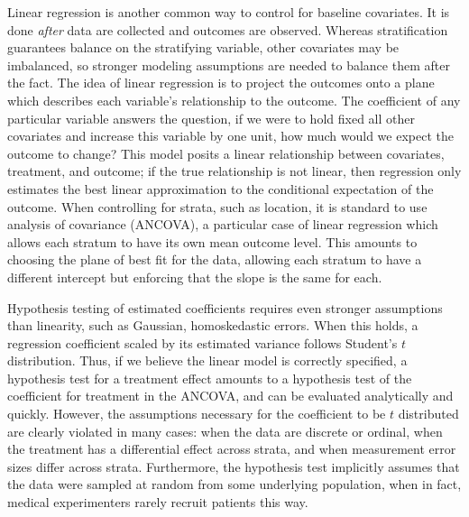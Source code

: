 \documentclass[11pt]{article}
\begin{document}
Linear regression is another common way to control for baseline covariates.
It is done \textit{after} data are collected and outcomes are observed.
Whereas stratification guarantees balance on the stratifying variable, other covariates may be imbalanced, so stronger modeling assumptions are needed to balance them after the fact.
The idea of linear regression is to project the outcomes onto a plane which describes each variable's relationship to the outcome.
The coefficient of any particular variable answers the question, if we were to hold fixed all other covariates and increase this variable by one unit, how much would we expect the outcome to change?
This model posits a linear relationship between covariates, treatment, and outcome; 
if the true relationship is not linear, then regression only estimates the best linear approximation to the conditional expectation of the outcome.
When controlling for strata, such as location, it is standard to use analysis of covariance (ANCOVA), a particular case of linear regression which allows each stratum to have its own mean outcome level.
This amounts to choosing the plane of best fit for the data, allowing each stratum to have a different intercept but enforcing that the slope is the same for each.

Hypothesis testing of estimated coefficients requires even stronger assumptions than linearity, such as Gaussian, homoskedastic errors.
When this holds, a regression coefficient scaled by its estimated variance follows Student's $t$ distribution.
Thus, if we believe the linear model is correctly specified, a hypothesis test for a treatment effect amounts to a hypothesis test of the coefficient for treatment in the ANCOVA, and can be evaluated analytically and quickly.
However, the assumptions necessary for the coefficient to be $t$ distributed are clearly violated in many cases:
when the data are discrete or ordinal, when the treatment has a differential effect across strata, and when measurement error sizes differ across strata.
Furthermore, the hypothesis test implicitly assumes that the data were sampled at random from some underlying population, when in fact,
medical experimenters rarely recruit patients this way.
\end{document}
